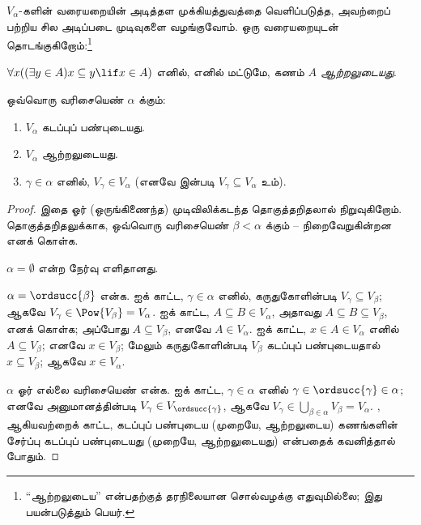 \documentclass[../../../include/open-logic-section]{subfiles}
\begin{document}

$V_\alpha$-களின் வரையறையின் அடித்தள முக்கியத்துவத்தை வெளிப்படுத்த,
அவற்றைப் பற்றிய சில அடிப்படை முடிவுகளை வழங்குவோம். ஒரு வரையறையுடன்
தொடங்குகிறோம்:\footnote{``ஆற்றலுடைய'' என்பதற்குத் தரநிலையான சொல்வழக்கு
எதுவுமில்லை; இது \citet{ButtonLT1} பயன்படுத்தும் பெயர்.}
\begin{defn}
	$\forall x((\exists y \in A)x \subseteq y \lif x \in A)$ எனில்,
	எனில் மட்டுமே, கணம் $A$ \emph{ஆற்றலுடையது}.
\end{defn}
\begin{lem}
ஒவ்வொரு வரிசையெண் $\alpha$ க்கும்:
\begin{enumerate}
	\item{} $V_\alpha$ கடப்புப் பண்புடையது.
	\item{} $V_\alpha$ ஆற்றலுடையது.
	\item{} $\gamma \in \alpha$ எனில், $V_\gamma
	\in V_\alpha$ (எனவே  இன்படி $V_\gamma
	\subseteq V_\alpha$ உம்).
\end{enumerate}
\end{lem}

\begin{proof}
இதை ஓர் (ஒருங்கிணைந்த) முடிவிலிக்கடந்த தொகுத்தறிதலால் நிறுவுகிறோம்.
தொகுத்தறிதலுக்காக, ஒவ்வொரு வரிசையெண் $\beta < \alpha$ க்கும்
-- நிறைவேறுகின்றன எனக் கொள்க.

$\alpha = \emptyset$ என்ற நேர்வு எளிதானது.

$\alpha = \ordsucc{\beta}$ என்க.  ஐக் காட்ட,
$\gamma \in \alpha$ எனில், கருதுகோளின்படி $V_\gamma \subseteq
V_\beta$; ஆகவே $V_\gamma \in \Pow{V_\beta} = V_\alpha$.
 ஐக் காட்ட, $A \subseteq B \in V_\alpha$,
அதாவது $A \subseteq B \subseteq V_\beta$, எனக் கொள்க; அப்போது
$A \subseteq V_\beta$, எனவே $A \in V_\alpha$. 
ஐக் காட்ட, $x \in A \in V_\alpha$ எனில் $A \subseteq V_\beta$;
எனவே $x \in V_\beta$; மேலும் கருதுகோளின்படி $V_\beta$ கடப்புப்
பண்புடையதால் $x \subseteq V_\beta$; ஆகவே $x \in V_\alpha$.

$\alpha$ ஓர் எல்லை வரிசையெண் என்க.  ஐக் காட்ட,
$\gamma \in \alpha$ எனில் $\gamma \in \ordsucc{\gamma} \in
\alpha$; எனவே அனுமானத்தின்படி $V_\gamma \in V_{\ordsucc{\gamma}}$,
ஆகவே $V_\gamma \in \bigcup_{\beta \in \alpha} V_\beta =
V_\alpha$. ,  ஆகியவற்றைக்
காட்ட, கடப்புப் பண்புடைய (முறையே, ஆற்றலுடைய) கணங்களின் சேர்ப்பு கடப்புப்
பண்புடையது (முறையே, ஆற்றலுடையது) என்பதைக் கவனித்தால் போதும்.
\end{proof}
\end{document}

